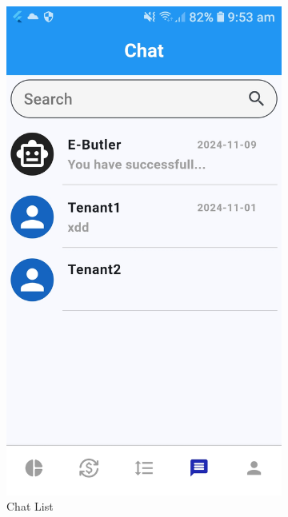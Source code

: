 \documentclass[sigconf]{acmart}
\begin{document}
\begin{figure}[h]
  \centering
  \begin{subfigure}{0.24\textwidth}
    \includegraphics[width=\textwidth]{chatList.jpg}
    \caption{Chat List}
    \label{fig:chatList}
  \end{subfigure}
  \begin{subfigure}{0.24\textwidth}

\end{subfigure}
\end{figure}
\end{document}
